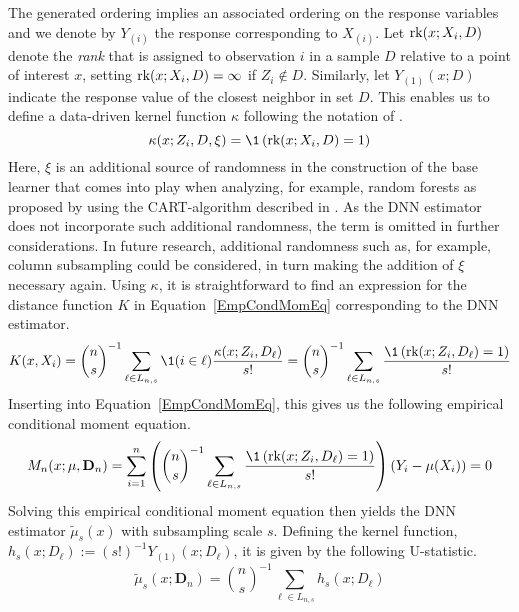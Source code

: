 The generated ordering implies an associated ordering on the response variables and we denote by $Y_{(i)}$ the response corresponding to $X_{(i)}$.
Let $\text{rk}(x; X_{i}, D)$ denote the \textit{rank} that is assigned to observation $i$ in a sample $D$ relative to a point of interest $x$, setting $\text{rk}(x; X_{i}, D) = \infty$ if $Z_{i} \not\in D$.
Similarly, let $Y_{(1)}(x; D)$ indicate the response value of the closest neighbor in set $D$.
This enables us to define a data-driven kernel function $\kappa$ following the notation of \citet{ritzwoller_uniform_2024}.
\begin{equation}
	\kappa(x; Z_{i}, D, \xi)
	= \1\left(\rk(x; X_{i}, D) = 1\right)
\end{equation}
Here, $\xi$ is an additional source of randomness in the construction of the base learner that comes into play when analyzing, for example, random forests as proposed by \citet{breiman_random_2001} using the CART-algorithm described in \citet{breiman_classification_2017}.
As the DNN estimator does not incorporate such additional randomness, the term is omitted in further considerations.
In future research, additional randomness such as, for example, column subsampling could be considered, in turn making the addition of $\xi$ necessary again.
Using $\kappa$, it is straightforward to find an expression for the distance function $K$ in Equation~\ref{EmpCondMomEq} corresponding to the DNN estimator.
\begin{equation}\label{eq:data_distance}
	K(x, X_{i})
	= \binom{n}{s}^{-1} \sum_{\ell \in L_{n,s}} \1(i \in \ell)\frac{\kappa(x; Z_{i}, D_{\ell})}{s!}
	= \binom{n}{s}^{-1} \sum_{\ell \in L_{n,s}} \frac{\1\left(\rk(x; Z_{i}, D_{\ell}) = 1\right)}{s!}
\end{equation}
Inserting into Equation~\ref{EmpCondMomEq}, this gives us the following empirical conditional moment equation.
\begin{equation}
	\begin{aligned}
		M_n(x; \mu, \mathbf{D}_n)
		= \sum_{i = 1}^{n}\left(\binom{n}{s}^{-1} \sum_{\ell \in L_{n,s}} \frac{\1\left(\rk(x; Z_{i}, D_{\ell}) = 1\right)}{s!}\right)\left(Y_{i} - \mu(X_{i})\right)
		= 0
	\end{aligned}
\end{equation}
Solving this empirical conditional moment equation then yields the DNN estimator $\tilde{\mu}_{s}(x)$ with subsampling scale $s$.
Defining the kernel function, $h_{s}(x; D_{\ell}) := (s!)^{-1} Y_{(1)}(x; D_{\ell})$, it is given by the following U-statistic.
\begin{equation}\label{eq:U_stat}
	\tilde{\mu}_{s}(x; \mathbf{D}_n)
	= \binom{n}{s}^{-1} \sum_{\ell \in L_{n,s}} h_{s}(x; D_{\ell})
\end{equation}
